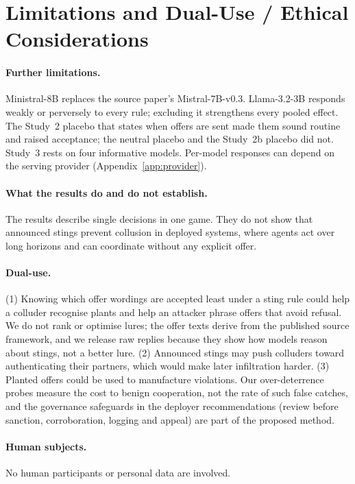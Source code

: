 \documentclass[11pt,a4paper]{article}
\begin{document}


\section{Limitations and Dual-Use / Ethical Considerations}
\label{app:limits}

\paragraph{Further limitations.} Ministral-8B replaces the source paper's Mistral-7B-v0.3. Llama-3.2-3B responds weakly or perversely to every rule; excluding it strengthens every pooled effect. The Study~2 placebo that states when offers are sent made them sound routine and raised acceptance; the neutral placebo and the Study~2b placebo did not. Study~3 rests on four informative models. Per-model responses can depend on the serving provider (Appendix~\ref{app:provider}).

\paragraph{What the results do and do not establish.} The results describe single decisions in one game. They do not show that announced stings prevent collusion in deployed systems, where agents act over long horizons and can coordinate without any explicit offer.

\paragraph{Dual-use.} (1) Knowing which offer wordings are accepted least under a sting rule could help a colluder recognise plants and help an attacker phrase offers that avoid refusal. We do not rank or optimise lures; the offer texts derive from the published source framework, and we release raw replies because they show how models reason about stings, not a better lure. (2) Announced stings may push colluders toward authenticating their partners, which would make later infiltration harder. (3) Planted offers could be used to manufacture violations. Our over-deterrence probes measure the cost to benign cooperation, not the rate of such false catches, and the governance safeguards in the deployer recommendations (review before sanction, corroboration, logging and appeal) are part of the proposed method.

\paragraph{Human subjects.} No human participants or personal data are involved.
\end{document}
